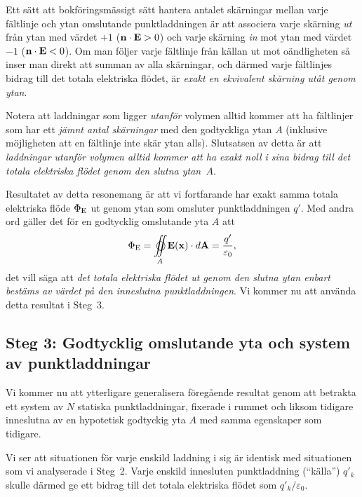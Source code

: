 Ett s{\"a}tt att bokf{\"o}ringsm{\"a}ssigt s{\"a}tt hantera antalet sk{\"a}rningar mellan varje f{\"a}ltlinje och ytan omslutande punktladdningen {\"a}r att associera varje sk{\"a}rning {\it ut} fr{\aa}n ytan med v{\"a}rdet $+1$ (${\bf n}\cdot{\bf E}>0$) och varje sk{\"a}rning {\it in} mot ytan med v{\"a}rdet $-1$ (${\bf n}\cdot{\bf E}<0$). Om man f{\"o}ljer varje f{\"a}ltlinje fr{\aa}n k{\"a}llan ut mot o{\"a}ndligheten s{\aa} inser man direkt att summan av alla sk{\"a}rningar, och d{\"a}rmed varje f{\"a}ltlinjes bidrag till det totala elektriska fl{\"o}det, {\"a}r {\it exakt en ekvivalent sk{\"a}rning ut{\aa}t genom ytan}.

Notera att laddningar som ligger {\it utanf{\"o}r} volymen alltid kommer att ha f{\"a}ltlinjer som har ett {\it j{\"a}mnt antal sk{\"a}rningar} med den godtyckliga ytan $A$ (inklusive m{\"o}jligheten att en f{\"a}ltlinje inte sk{\"a}r ytan alls). Slutsatsen av detta {\"a}r att {\it laddningar utanf{\"o}r volymen alltid kommer att ha exakt noll i sina bidrag till det totala elektriska fl{\"o}det genom den slutna ytan~$A$}.

Resultatet av detta resonemang {\"a}r att vi fortfarande har exakt samma totala elektriska fl{\"o}de $\Phi_{\rm E}$ ut genom ytan som omsluter punktladdningen $q'$. Med andra ord g{\"a}ller det f{\"o}r en godtycklig omslutande yta $A$ att
$$
  \Phi_{\rm E}=\oiint_A {\bf E}({\bf x})\cdot d{\bf A}={{q'}\over{\varepsilon_0}},
$$
det vill s{\"a}ga att {\it det totala elektriska fl{\"o}det ut genom den slutna ytan enbart best{\"a}ms av v{\"a}rdet p{\aa} den inneslutna punktladdningen}. Vi kommer nu att anv{\"a}nda detta resultat i Steg~3.
\vfill\eject

\subsection{Steg 3: Godtycklig omslutande yta och system av punktladdningar}
Vi kommer nu att ytterligare generalisera f{\"o}reg{\aa}ende resultat genom att betrakta ett system av $N$ statiska punktladdningar, fixerade i rummet och liksom tidigare inneslutna av en hypotetisk godtyckig yta $A$ med samma egenskaper som tidigare.
\bigskip\centerline{}
\medskip
\noindent
Vi ser att situationen f{\"o}r varje enskild laddning i sig {\"a}r identisk med situationen som vi analyserade i Steg~2. Varje enskild innesluten punktladdning (``k{\"a}lla'') $q'_k$ skulle d{\"a}rmed ge ett bidrag till det totala elektriska fl{\"o}det som $q'_k/\varepsilon_0$.

